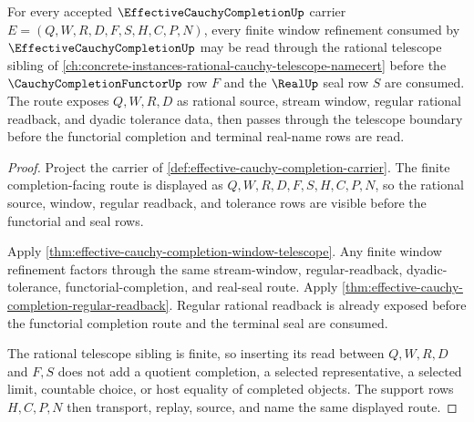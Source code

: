 \begin{theorem}\label{thm:effective-cauchy-completion-rational-telescope-route}
For every accepted $\EffectiveCauchyCompletionUp$ carrier $E=(Q,W,R,D,F,S,H,C,P,N)$, every finite window refinement consumed by $\EffectiveCauchyCompletionUp$ may be read through the rational telescope sibling of \autoref{ch:concrete-instances-rational-cauchy-telescope-namecert} before the $\CauchyCompletionFunctorUp$ row $F$ and the $\RealUp$ seal row $S$ are consumed. The route exposes $Q,W,R,D$ as rational source, stream window, regular rational readback, and dyadic tolerance data, then passes through the telescope boundary before the functorial completion and terminal real-name rows are read.
\end{theorem}
\begin{proof}
Project the carrier of \autoref{def:effective-cauchy-completion-carrier}. The finite completion-facing route is displayed as $Q,W,R,D,F,S,H,C,P,N$, so the rational source, window, regular readback, and tolerance rows are visible before the functorial and seal rows.

Apply \autoref{thm:effective-cauchy-completion-window-telescope}. Any finite window refinement factors through the same stream-window, regular-readback, dyadic-tolerance, functorial-completion, and real-seal route. Apply \autoref{thm:effective-cauchy-completion-regular-readback}. Regular rational readback is already exposed before the functorial completion route and the terminal seal are consumed.

The rational telescope sibling is finite, so inserting its read between $Q,W,R,D$ and $F,S$ does not add a quotient completion, a selected representative, a selected limit, countable choice, or host equality of completed objects. The support rows $H,C,P,N$ then transport, replay, source, and name the same displayed route.
\end{proof}

